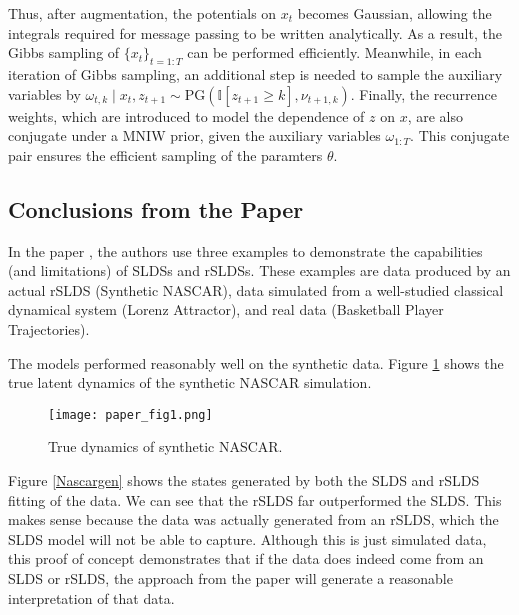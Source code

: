 Thus, after augmentation, the potentials on $x_{t}$ becomes Gaussian, allowing the integrals required for message passing to be written analytically. As a result, the Gibbs sampling of $\{x_t\}_{t=1:T}$ can be performed efficiently. Meanwhile, in each iteration of Gibbs sampling, an additional step is needed to sample the auxiliary variables by $\omega_{t, k} \mid x_{t}, z_{t+1} \sim \mathrm{PG}\left(\mathbb{I}\left[z_{t+1} \geq k\right], \nu_{t+1, k}\right)$. Finally, the recurrence weights, which are introduced to model the dependence of $z$ on $x$, are also conjugate under a MNIW prior, given the auxiliary variables $\omega_{1: T}$. This conjugate pair ensures the efficient sampling of the paramters $\theta$.



\subsection{Conclusions from the Paper}

In the paper \cite{linderman_bayesian_2017}, the authors use three examples to demonstrate the capabilities (and limitations) of SLDSs and rSLDSs. These examples are data produced by an actual rSLDS (Synthetic NASCAR), data simulated from a well-studied classical dynamical system (Lorenz Attractor), and real data (Basketball Player Trajectories).

The models performed reasonably well on the synthetic data. Figure \ref{trueNascar} shows the true latent dynamics of the synthetic NASCAR simulation.
\begin{figure}[h!]
	\centering
	\texttt{[image: paper\_fig1.png]}
	\caption{True dynamics of synthetic NASCAR.}
	\label{trueNascar}
\end{figure}

Figure \ref{Nascargen} shows the states generated by both the SLDS and rSLDS fitting of the data. We can see that the rSLDS far outperformed the SLDS. This makes sense because the data was actually generated from an rSLDS, which the SLDS model will not be able to capture. Although this is just simulated data, this proof of concept demonstrates that if the data does indeed come from an SLDS or rSLDS, the approach from the paper will generate a reasonable interpretation of that data.

